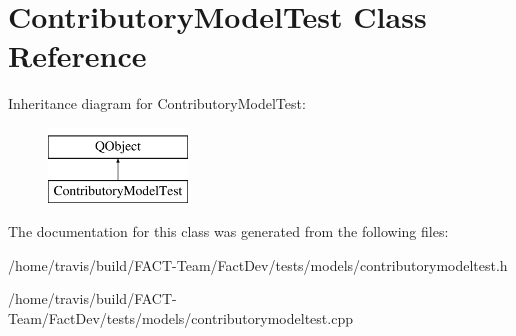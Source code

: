 \hypertarget{classContributoryModelTest}{\section{Contributory\-Model\-Test Class Reference}
\label{classContributoryModelTest}
}
Inheritance diagram for Contributory\-Model\-Test\-:\begin{figure}[H]
\begin{center}
\leavevmode
\includegraphics[height=2.000000cm]{d5/d97/classContributoryModelTest}
\end{center}
\end{figure}


The documentation for this class was generated from the following files\-:\begin{DoxyCompactItemize}
\item 
/home/travis/build/\-F\-A\-C\-T-\/\-Team/\-Fact\-Dev/tests/models/contributorymodeltest.\-h\item 
/home/travis/build/\-F\-A\-C\-T-\/\-Team/\-Fact\-Dev/tests/models/contributorymodeltest.\-cpp\end{DoxyCompactItemize}
